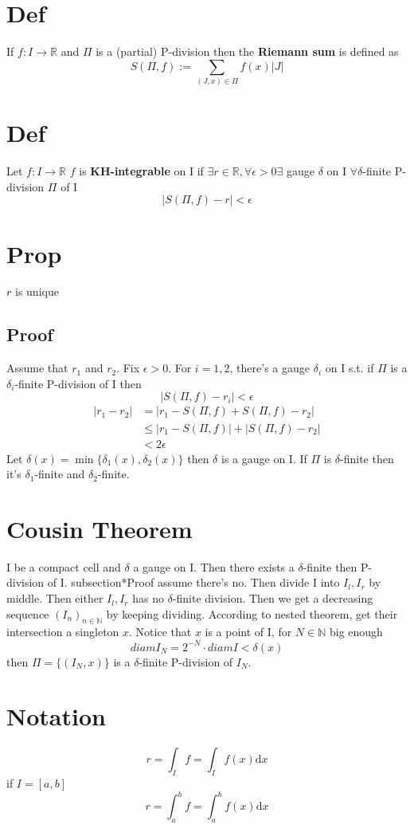 \documentclass{book}
\newcommand{\abs}[1]{\left\lvert #1 \right\rvert}
\begin{document}
\section{Def}
If $f:I\rightarrow\mathbb R$ and $\Pi$ is a (partial) P-division then the \textbf{Riemann sum} is defined as$$S(\Pi,f):=\sum\limits_{(J,x)\in \Pi}f(x)\abs{J}$$
\section{Def}
Let $f:I\rightarrow\mathbb R$ $f$ is \textbf{KH-integrable} on I if $\exists r\in \mathbb R, \forall \epsilon>0\exists$ gauge $\delta$ on I $\forall \delta$-finite P-division $\Pi$ of I$$\abs{S(\Pi,f)-r}<\epsilon$$
\section{Prop}$r$ is unique
\subsection*{Proof}
Assume that $r_1$ and $r_2$. Fix $\epsilon>0$. For $i=1,2$, there's a gauge $\delta_i$ on I s.t. if $\Pi$ is a $\delta_i$-finite P-division of I then $$\abs{S(\Pi,f)-r_i}<\epsilon$$
$$\begin{aligned}
    \abs{r_1-r_2}&=\abs{r_1-S(\Pi,f)+S(\Pi,f)-r_2}\\ &\leq\abs{r_1-S(\Pi,f)}+\abs{S(\Pi,f)-r_2}\\ &<2\epsilon
\end{aligned}$$
Let $\delta(x)=\min\{\delta_1(x),\delta_2(x)\}$ then $\delta$ is a gauge on I. If $\Pi$ is $\delta$-finite then it's $\delta_1$-finite and $\delta_2$-finite.
\section{Cousin Theorem}
I be a compact cell and $\delta$ a gauge on I. Then there exists a $\delta$-finite then P-division of I.
subsection*{Proof}
assume there's no. Then divide I into $I_l,I_r$ by middle. Then either $I_l,I_r$ has no $\delta$-finite division. Then we get a decreasing sequence $(I_n)_{n\in \mathbb N}$ by keeping dividing. According to nested theorem, get their intersection a singleton $x$. Notice that $x$ is a point of I, for $N\in \mathbb N$ big enough
$$diam I_N=2^{-N}\cdot diam I<\delta(x)$$then $\Pi=\{(I_N,x)\}$ is a $\delta$-finite P-division of $I_N$.
\section{Notation}
$$r=\int_If=\int_If(x)\text{d}x$$
if $I=[a,b]$
$$r=\int_a^bf=\int_a^bf(x)\text{d}x$$
\end{document}

